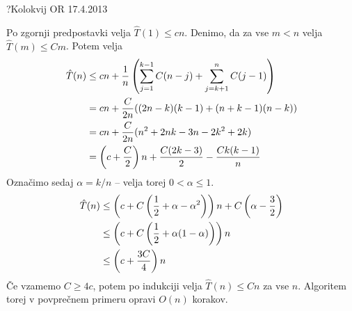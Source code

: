 \begin{naloga}{?}{Kolokvij OR 17.4.2013}
\begin{odgovor}
Po zgornji predpostavki velja $\hat{T}(1) \le cn$.
Denimo, da za vse $m < n$ velja $\hat{T}(m) \le Cm$.
Potem velja
\begin{align*}
\hat{T}(n) &\le cn +
{1 \over n} \left(\sum_{j=1}^{k-1} C(n-j) +
\sum_{j=k+1}^n C(j-1) \right) \\
&= cn + {C \over 2n} ((2n-k)(k-1) + (n+k-1)(n-k)) \\
&= cn + {C \over 2n} (n^2 + 2nk - 3n - 2k^2 + 2k) \\
&= \left(c + {C \over 2}\right) n + {C(2k - 3) \over 2} - {Ck(k-1) \over n}
\end{align*}
Označimo sedaj $\alpha = k/n$ -- velja torej $0 < \alpha \le 1$.
\begin{align*}
\hat{T}(n) &\le
\left(c + C \left({1 \over 2} + \alpha - \alpha^2\right) \right) n
+ C \left(\alpha - {3 \over 2}\right) \\
&\le \left(c + C \left({1 \over 2} + \alpha (1 - \alpha)\right) \right) n \\
&\le \left(c + {3C \over 4} \right) n
\end{align*}
Če vzamemo $C \ge 4c$,
potem po indukciji velja $\hat{T}(n) \le Cn$ za vse $n$.
Algoritem torej v povprečnem primeru opravi $O(n)$ korakov.
\end{odgovor}
\end{naloga}
